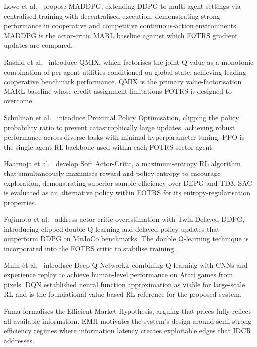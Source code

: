 \documentclass[12pt,a4paper,oneside]{report}
\theoremstyle{definition}
\theoremstyle{remark}
\begin{document}
\noindent Lowe et al.\ \cite{Lowe2017MADDPG} propose MADDPG, extending DDPG to multi-agent settings via centralised training with decentralised execution, demonstrating strong performance in cooperative and competitive continuous-action environments. MADDPG is the actor-critic MARL baseline against which FOTRS gradient updates are compared.

\medskip

\noindent Rashid et al.\ \cite{Rashid2018QMIX} introduce QMIX, which factorises the joint Q-value as a monotonic combination of per-agent utilities conditioned on global state, achieving leading cooperative benchmark performance. QMIX is the primary value-factorisation MARL baseline whose credit assignment limitations FOTRS is designed to overcome.

\medskip

\noindent Schulman et al.\ \cite{Schulman2017PPO} introduce Proximal Policy Optimisation, clipping the policy probability ratio to prevent catastrophically large updates, achieving robust performance across diverse tasks with minimal hyperparameter tuning. PPO is the single-agent RL backbone used within each FOTRS sector agent.

\medskip

\noindent Haarnoja et al.\ \cite{Haarnoja2018SAC} develop Soft Actor-Critic, a maximum-entropy RL algorithm that simultaneously maximises reward and policy entropy to encourage exploration, demonstrating superior sample efficiency over DDPG and TD3. SAC is evaluated as an alternative policy within FOTRS for its entropy-regularisation properties.

\medskip

\noindent Fujimoto et al.\ \cite{Fujimoto2018TD3} address actor-critic overestimation with Twin Delayed DDPG, introducing clipped double Q-learning and delayed policy updates that outperform DDPG on MuJoCo benchmarks. The double Q-learning technique is incorporated into the FOTRS critic to stabilise training.

\medskip

\noindent Mnih et al.\ \cite{Mnih2015DQN} introduce Deep Q-Networks, combining Q-learning with CNNs and experience replay to achieve human-level performance on Atari games from pixels. DQN established neural function approximation as viable for large-scale RL and is the foundational value-based RL reference for the proposed system.

\medskip

\noindent Fama \cite{Fama1970EMH} formalises the Efficient Market Hypothesis, arguing that prices fully reflect all available information. EMH motivates the system's design around semi-strong efficiency regimes where information latency creates exploitable edges that IDCR addresses.
\end{document}
